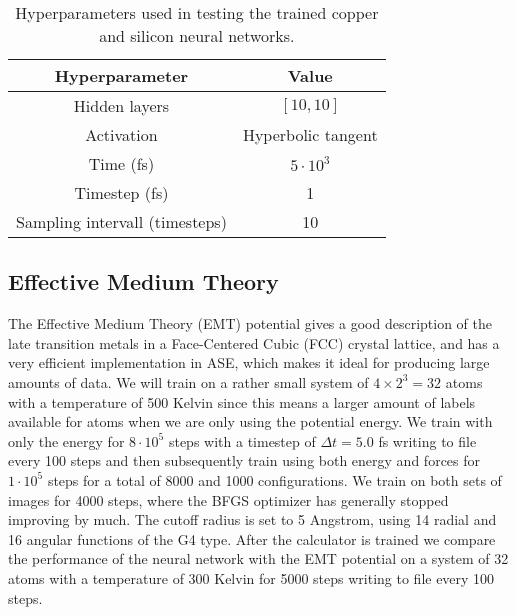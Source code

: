 \begin{table}[H]
\centering
\caption{Hyperparameters used in testing the trained copper and
    silicon neural networks.}
\label{tab:hyperparam-test}
\begin{tabular}{|c c|}
\hline
Hyperparameter & Value \\
\hline \hline
    Hidden layers & $\left[10, 10\right]$ \\
Activation & Hyperbolic tangent \\
    Time (fs) & $5 \cdot 10^3$ \\
    Timestep (fs) & 1 \\
    Sampling intervall (timesteps) & 10 \\
\hline
\end{tabular}
\end{table}

\subsection{Effective Medium Theory}\label{chap:emt}
The Effective Medium Theory (EMT) potential 
\cite{jacobsen1987interatomic, jacobsen1996semi}
gives a good description
of the late transition metals in a Face-Centered Cubic (FCC) crystal
lattice, and has a very efficient implementation in ASE,
which makes it ideal for producing large amounts of data.
We will train on a rather small system of $4 \times 2^3 = 32$ atoms
with a temperature of 500 Kelvin since this means a larger amount of labels available
for atoms when we are only using the potential energy.
We train with only the energy for $8 \cdot 10^5$ steps
with a timestep of $\Delta t = 5.0$ fs
writing to file every 100 steps and then subsequently
train using both energy and forces for $1 \cdot 10^5$ steps
for a total of 8000 and 1000 configurations. 
We train on both sets of images
for 4000 steps, where the BFGS optimizer has generally stopped
improving by much.
The cutoff radius is set to 5 Angstrom, using 14 radial and
16 angular functions of the G4 type.
After the calculator is trained we compare the performance
of the neural network with the EMT potential on a system
of 32 atoms with a temperature of 300 Kelvin for 5000 steps
writing to file every 100 steps.

